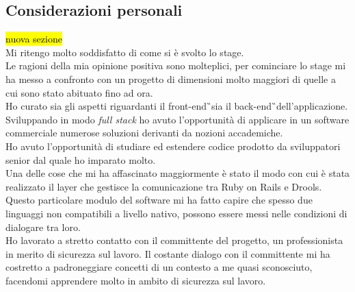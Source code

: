 \subsection{Considerazioni personali}
\hl{nuova sezione}\\
	Mi ritengo molto soddisfatto di come si è svolto lo stage.\\
	Le ragioni della mia opinione positiva sono molteplici, per cominciare lo stage mi ha messo a confronto con un progetto di dimensioni molto maggiori di quelle a cui sono stato abituato fino ad ora. \\
	Ho curato sia gli aspetti riguardanti il \gls{front-end}\G\ sia il \gls{back-end}\G\ dell'applicazione. Sviluppando in modo  \textit{full stack} ho avuto l'opportunità di applicare in un software commerciale numerose soluzioni derivanti da nozioni accademiche. \\
	Ho avuto l'opportunità di studiare ed estendere codice prodotto da sviluppatori senior dal quale ho imparato molto.\\
	Una delle cose che mi ha affascinato maggiormente è stato il modo con cui è stata realizzato il layer che gestisce la comunicazione tra  Ruby on Rails e Drools. Questo particolare modulo del software mi ha fatto capire che spesso due linguaggi non compatibili a livello nativo, possono essere messi nelle condizioni di dialogare tra loro. \\
	Ho lavorato a stretto contatto con il committente del progetto, un professionista in merito di sicurezza sul lavoro. Il costante dialogo con il committente mi ha costretto a padroneggiare concetti di un contesto a me quasi sconosciuto, facendomi apprendere molto in ambito di sicurezza sul lavoro.